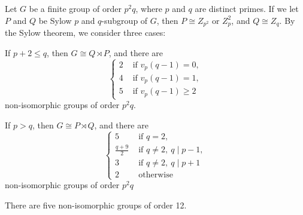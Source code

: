 \documentclass{../../large}
\begin{document}
\begin{prb}
Let $G$ be a finite group of order $p^2q$, where $p$ and $q$ are distinct primes.
If we let $P$ and $Q$ be Sylow $p$ and $q$-subgroup of $G$, then $P\cong Z_{p^2}\text{ or }Z_p^2$, and $Q\cong Z_q$.
By the Sylow theorem, we consider three cases:
\begin{parts}
\item If $p+2\le q$, then $G\cong Q\rtimes P$, and there are
\[\begin{cases}
2&\text{ if }v_p(q-1)=0,\\
4&\text{ if }v_p(q-1)=1,\\
5&\text{ if }v_p(q-1)\ge2
\end{cases}\]
non-isomorphic groups of order $p^2q$.
\item If $p>q$, then $G\cong P\rtimes Q$, and there are
\[\begin{cases}
5&\text{ if }q=2,\\
\frac{q+9}2&\text{ if }q\ne2,\ q\mid p-1,\\
3&\text{ if }q\ne2,\ q\mid p+1\\
2&\text{ otherwise }
\end{cases}\]
non-isomorphic groups of order $p^2q$
\item There are five non-isomorphic groups of order 12.
\end{parts}
\end{prb}
\end{document}
